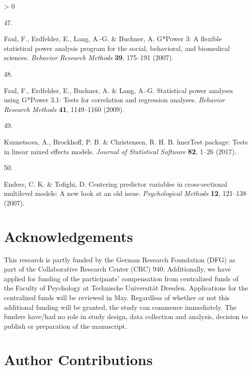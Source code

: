 \documentclass[
  english,
  man,floatsintext]{apa6}
\newlength{\cslhangindent}
\newlength{\csllabelwidth}
\newenvironment{CSLReferences}[2] %
 {%
  \setlength{\parindent}{0pt}
  \ifodd #1 \everypar{\setlength{\hangindent}{\cslhangindent}}\ignorespaces\fi
  \ifnum #2 > 0
  \setlength{\parskip}{#2\baselineskip}
  \fi
 }%
 {}
\newcommand{\CSLLeftMargin}[1]{\parbox[t]{\csllabelwidth}{#1}}
\newcommand{\CSLRightInline}[1]{\parbox[t]{\linewidth - \csllabelwidth}{#1}\break}
\begin{document}
\begin{CSLReferences}{0}{0}
\leavevmode\hypertarget{ref-Faul2007}{}%
\CSLLeftMargin{47. }
\CSLRightInline{Faul, F., Erdfelder, E., Lang, A.-G. \& Buchner, A. G*{Power} 3: {A} flexible statistical power analysis program for the social, behavioral, and biomedical sciences. \emph{Behavior Research Methods} \textbf{39}, 175--191 (2007).}

\leavevmode\hypertarget{ref-Faul2009}{}%
\CSLLeftMargin{48. }
\CSLRightInline{Faul, F., Erdfelder, E., Buchner, A. \& Lang, A.-G. Statistical power analyses using {G}*{Power} 3.1: {Tests} for correlation and regression analyses. \emph{Behavior Research Methods} \textbf{41}, 1149--1160 (2009).}

\leavevmode\hypertarget{ref-Kuznetsova2017}{}%
\CSLLeftMargin{49. }
\CSLRightInline{Kuznetsova, A., Brockhoff, P. B. \& Christensen, R. H. B. {lmerTest} package: Tests in linear mixed effects models. \emph{Journal of Statistical Software} \textbf{82}, 1--26 (2017).}

\leavevmode\hypertarget{ref-Enders2007}{}%
\CSLLeftMargin{50. }
\CSLRightInline{Enders, C. K. \& Tofighi, D. Centering predictor variables in cross-sectional multilevel models: {A} new look at an old issue. \emph{Psychological Methods} \textbf{12}, 121--138 (2007).}

\end{CSLReferences}

\endgroup

\newpage

\hypertarget{acknowledgements}{%
\section{Acknowledgements}\label{acknowledgements}}

This research is partly funded by the German Research Foundation (DFG) as part of the Collaborative Research Center (CRC) 940.
Additionally, we have applied for funding of the participants' compensation from centralized funds of the Faculty of Psychology at Technische Universität Dresden.
Applications for the centralized funds will be reviewed in May.
Regardless of whether or not this additional funding will be granted, the study can commence immediately.
The funders have/had no role in study design, data collection and analysis, decision to publish or preparation of the manuscript.

\hypertarget{author-contributions}{%
\section{Author Contributions}\label{author-contributions}}
\end{document}
